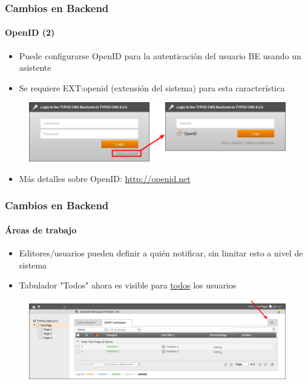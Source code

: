
\begin{frame}[fragile]
	\frametitle{Cambios en Backend}
	\framesubtitle{OpenID (2)}

 	\begin{itemize}
		\item Puede configurarse OpenID para la autenticación del usuario BE usando un asistente
		\item Se requiere EXT:openid (extensión del sistema) para esta característica
	\end{itemize}

	\begin{figure}
		\includegraphics[width=0.8\linewidth]{Images/BackendChanges/OpenIdLogin.png}
	\end{figure}

 	\begin{itemize}
		\item Más detalles sobre OpenID:\newline
			\small\url{http://openid.net}\normalsize
	\end{itemize}

\end{frame}


\begin{frame}[fragile]
	\frametitle{Cambios en Backend}
	\framesubtitle{Áreas de trabajo}

 	\begin{itemize}
		\item Editores/usuarios pueden definir a quién notificar, sin limitar esto a nivel de sistema
		\item Tabulador "Todos" ahora es visible para \underline{todos} los usuarios
	\end{itemize}

	\begin{figure}
		\includegraphics[width=0.95\linewidth]{Images/BackendChanges/WorkspacesTabAll.png}
	\end{figure}

\end{frame}


